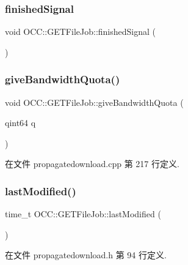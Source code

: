 \subsubsection{\texorpdfstring{finished\+Signal}{finishedSignal}}
{\footnotesize\ttfamily void O\+C\+C\+::\+G\+E\+T\+File\+Job\+::finished\+Signal (\begin{DoxyParamCaption}{ }\end{DoxyParamCaption})\hspace{0.3cm}{\ttfamily [signal]}}

\mbox{\label{class_o_c_c_1_1_g_e_t_file_job_a074cd41e4e1d4a40971cb440ed5f4c1a}} 
\subsubsection{\texorpdfstring{give\+Bandwidth\+Quota()}{giveBandwidthQuota()}}
{\footnotesize\ttfamily void O\+C\+C\+::\+G\+E\+T\+File\+Job\+::give\+Bandwidth\+Quota (\begin{DoxyParamCaption}\item[{qint64}]{q }\end{DoxyParamCaption})}



在文件 propagatedownload.\+cpp 第 217 行定义.

\mbox{\label{class_o_c_c_1_1_g_e_t_file_job_ad9f7d91356e7e3fb74c3f4fede6ffde8}} 
\subsubsection{\texorpdfstring{last\+Modified()}{lastModified()}}
{\footnotesize\ttfamily time\+\_\+t O\+C\+C\+::\+G\+E\+T\+File\+Job\+::last\+Modified (\begin{DoxyParamCaption}{ }\end{DoxyParamCaption})}



在文件 propagatedownload.\+h 第 94 行定义.

